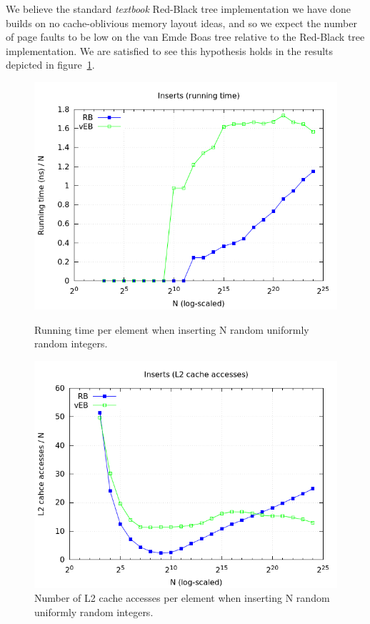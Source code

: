 \documentclass[a4paper,oneside,article,11pt]{memoir}
\begin{document}
We believe the standard \textit{textbook} Red-Black tree implementation we have done builds on no cache-oblivious memory layout ideas, and so we expect the number of page faults to be low on the van Emde Boas tree relative to the Red-Black tree implementation. We are satisfied to see this hypothesis holds in the results depicted in figure~\ref{fig:rbveb_insert_pf}.

\begin{figure}[H]
\centering
\begin{minipage}{0.48\columnwidth}
  \centering
  \includegraphics[width=\linewidth]{../res/rbveb/rbveb_insert_rt_div_n.png}%
  \caption{Running time per element when inserting N random uniformly random integers.}
  \label{fig:rbveb_insert_rt_div_n}
\end{minipage}%
\hfill
\begin{minipage}{0.48\columnwidth}
  \centering
  \includegraphics[width=\linewidth]{../res/rbveb/rbveb_insert_tca.png}%
  \caption{Number of L2 cache accesses per element when inserting N random uniformly random integers.}
  \label{fig:rbveb_insert_pf}
\end{minipage}
\end{figure}
\end{document}
